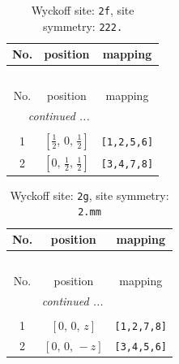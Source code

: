 \documentclass[fleqn,8pt]{jsarticle}
\begin{document}
\renewcommand{\arraystretch}{1.2}
\begin{longtable}{ccc}
\caption{Wyckoff site: {\tt 2f}, site symmetry: {\tt 222.}}
 \\
 \hline \hline
No. & position & mapping \\ \hline \endfirsthead

\multicolumn{2}{l}{\tablename\ \thetable{}} \\
 \hline \hline
No. & position & mapping \\ \hline \endhead

 \hline \hline
\multicolumn{2}{r}{\footnotesize\it continued ...} \\ \endfoot

 \hline \hline
\multicolumn{2}{r}{} \\ \endlastfoot

1 & $\left[ \frac{1}{2},\, 0,\, \frac{1}{2} \right]$ & {\tt [1,2,5,6]} \\ \hline
2 & $\left[ 0,\, \frac{1}{2},\, \frac{1}{2} \right]$ & {\tt [3,4,7,8]} \\
\end{longtable}
\renewcommand{\arraystretch}{1.2}
\begin{longtable}{ccc}
\caption{Wyckoff site: {\tt 2g}, site symmetry: {\tt 2.mm}}
 \\
 \hline \hline
No. & position & mapping \\ \hline \endfirsthead

\multicolumn{2}{l}{\tablename\ \thetable{}} \\
 \hline \hline
No. & position & mapping \\ \hline \endhead

 \hline \hline
\multicolumn{2}{r}{\footnotesize\it continued ...} \\ \endfoot

 \hline \hline
\multicolumn{2}{r}{} \\ \endlastfoot

1 & $\left[ 0,\, 0,\, z \right]$ & {\tt [1,2,7,8]} \\ \hline
2 & $\left[ 0,\, 0,\, - z \right]$ & {\tt [3,4,5,6]} \\
\end{longtable}
\renewcommand{\arraystretch}{1.2}
\end{document}
